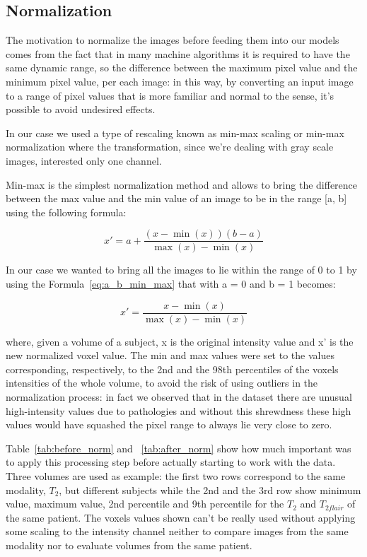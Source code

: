 \subsection{Normalization}
\label{sec:normalization}
The motivation to normalize the images before feeding them into our models comes from the fact that in many machine algorithms it is required to have the same dynamic range, so the difference between the maximum pixel value and the minimum pixel value, per each image: in this way, by converting an input image to a range of pixel values that is more familiar and normal to the sense, it's possible to avoid undesired effects.

\vspace{2mm} %
In our case we used a type of rescaling known as min-max scaling or min-max normalization where the transformation, since we're dealing with gray scale images, interested only one channel.

\vspace{2mm} %
Min-max is the simplest normalization method and allows to bring the difference between the max value and the min value of an image to be in the range [a, b] using the following formula:

\begin{equation} \label{eq:a_b_min_max}
x' = a + \dfrac{(x - \min(x))(b - a)}{\max(x) - \min(x)}
\end{equation}

In our case we wanted to bring all the images to lie within the range of 0 to 1 by using the Formula~\ref{eq:a_b_min_max} that with a = 0 and b = 1 becomes:

\begin{equation} \label{eq:min_max}
x' = \dfrac{x - \min(x)}{\max(x) - \min(x)}
\end{equation}

where, given a volume of a subject, x is the original intensity value and x' is the new normalized voxel value.
The min and max values were set to the values corresponding, respectively, to the 2nd and the 98th percentiles of the voxels intensities of the whole volume, to avoid the risk of using outliers in the normalization process: in fact we observed that in the dataset there are unusual high-intensity values due to pathologies and without this shrewdness these high values would have squashed the pixel range to always lie very close to zero.

\vspace{2mm} %
Table~\ref{tab:before_norm} and ~\ref{tab:after_norm} show how much important was to apply this processing step before actually starting to work with the data. Three volumes are used as example: the first two rows correspond to the same modality, $T_{2}$, but different subjects while the 2nd and the 3rd row show minimum value, maximum value, 2nd percentile and 9th percentile for the $T_{2}$ and $T_{2flair}$ of the same patient.
The voxels values shown can't be really used without applying some scaling to the intensity channel neither to compare images from the same modality nor to evaluate volumes from the same patient.

